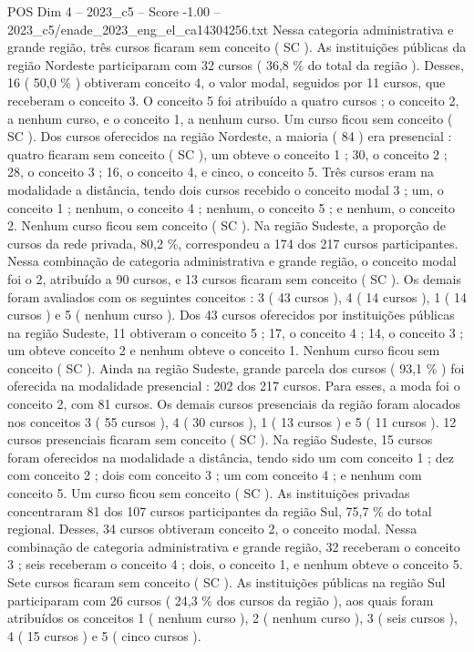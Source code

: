 \begin{textsample}{POS Dim 4 – 2023\_c5 – Score -1.00 – 2023\_c5/enade\_2023\_eng\_el\_ca14304256.txt}
Nessa categoria administrativa e grande região, três cursos ficaram sem conceito ( SC ).
As instituições públicas da região Nordeste participaram com 32 cursos ( 36,8 \% do total da região ).
Desses, 16 ( 50,0 \% ) obtiveram conceito 4, o valor modal, seguidos por 11 cursos, que receberam o conceito 3.
O conceito 5 foi atribuído a quatro cursos ; o conceito 2, a nenhum curso, e o conceito 1, a nenhum curso.
Um curso ficou sem conceito ( SC ).
Dos cursos oferecidos na região Nordeste, a maioria ( 84 ) era presencial : quatro ficaram sem conceito ( SC ), um obteve o conceito 1 ; 30, o conceito 2 ; 28, o conceito 3 ; 16, o conceito 4, e cinco, o conceito 5.
Três cursos eram na modalidade a distância, tendo dois cursos recebido o conceito modal 3 ; um, o conceito 1 ; nenhum, o conceito 4 ; nenhum, o conceito 5 ; e nenhum, o conceito 2.
Nenhum curso ficou sem conceito ( SC ).
Na região Sudeste, a proporção de cursos da rede privada, 80,2 \%, correspondeu a 174 dos 217 cursos participantes.
Nessa combinação de categoria administrativa e grande região, o conceito modal foi o 2, atribuído a 90 cursos, e 13 cursos ficaram sem conceito ( SC ).
Os demais foram avaliados com os seguintes conceitos : 3 ( 43 cursos ), 4 ( 14 cursos ), 1 ( 14 cursos ) e 5 ( nenhum curso ).
Dos 43 cursos oferecidos por instituições públicas na região Sudeste, 11 obtiveram o conceito 5 ; 17, o conceito 4 ; 14, o conceito 3 ; um obteve conceito 2 e nenhum obteve o conceito 1.
Nenhum curso ficou sem conceito ( SC ).
Ainda na região Sudeste, grande parcela dos cursos ( 93,1 \% ) foi oferecida na modalidade presencial : 202 dos 217 cursos.
Para esses, a moda foi o conceito 2, com 81 cursos.
Os demais cursos presenciais da região foram alocados nos conceitos 3 ( 55 cursos ), 4 ( 30 cursos ), 1 ( 13 cursos ) e 5 ( 11 cursos ). 12 cursos presenciais ficaram sem conceito ( SC ).
Na região Sudeste, 15 cursos foram oferecidos na modalidade a distância, tendo sido um com conceito 1 ; dez com conceito 2 ; dois com conceito 3 ; um com conceito 4 ; e nenhum com conceito 5.
Um curso ficou sem conceito ( SC ).
As instituições privadas concentraram 81 dos 107 cursos participantes da região Sul, 75,7 \% do total regional.
Desses, 34 cursos obtiveram conceito 2, o conceito modal.
Nessa combinação de categoria administrativa e grande região, 32 receberam o conceito 3 ; seis receberam o conceito 4 ; dois, o conceito 1, e nenhum obteve o conceito 5.
Sete cursos ficaram sem conceito ( SC ).
As instituições públicas na região Sul participaram com 26 cursos ( 24,3 \% dos cursos da região ), aos quais foram atribuídos os conceitos 1 ( nenhum curso ), 2 ( nenhum curso ), 3 ( seis cursos ), 4 ( 15 cursos ) e 5 ( cinco cursos ).

\end{textsample}
